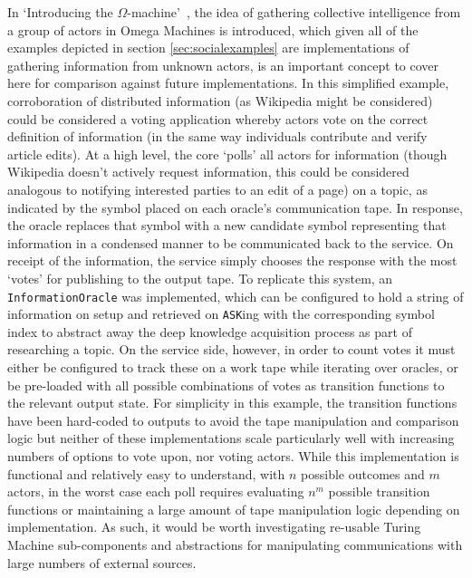 \documentclass[12pt]{article}
\begin{document}
		In `Introducing the $\Omega$-machine'~\cite{Zhang2014}, the idea of gathering collective intelligence from a group of actors in Omega Machines is introduced, which given all of the examples depicted in section \ref{sec:socialexamples} are implementations of gathering information from unknown actors, is an important concept to cover here for comparison against future implementations.
		In this simplified example, corroboration of distributed information (as Wikipedia might be considered) could be considered a voting application whereby actors vote on the correct definition of information (in the same way individuals contribute and verify article edits).
		At a high level, the core `polls' all actors for information (though Wikipedia doesn't actively request information, this could be considered analogous to notifying interested parties to an edit of a page) on a topic, as indicated by the symbol placed on each oracle's communication tape.
		In response, the oracle replaces that symbol with a new candidate symbol representing that information in a condensed manner to be communicated back to the service. On receipt of the information, the service simply chooses the response with the most `votes' for publishing to the output tape.
		To replicate this system, an \texttt{InformationOracle} was implemented, which can be configured to hold a string of information on setup and retrieved on \texttt{ASK}ing with the corresponding symbol index to abstract away the deep knowledge acquisition process as part of researching a topic.
		On the service side, however, in order to count votes it must either be configured to track these on a work tape while iterating over oracles, or be pre-loaded with all possible combinations of votes as transition functions to the relevant output state.
		For simplicity in this example, the transition functions have been hard-coded to outputs to avoid the tape manipulation and comparison logic but neither of these implementations scale particularly well with increasing numbers of options to vote upon, nor voting actors.
		While this implementation is functional and relatively easy to understand, with $n$ possible outcomes and $m$ actors, in the worst case each poll requires evaluating $n^m$ possible transition functions or maintaining a large amount of tape manipulation logic depending on implementation.
		As such, it would be worth investigating re-usable Turing Machine sub-components and abstractions for manipulating communications with large numbers of external sources.
		
	\clearpage
\end{document}
